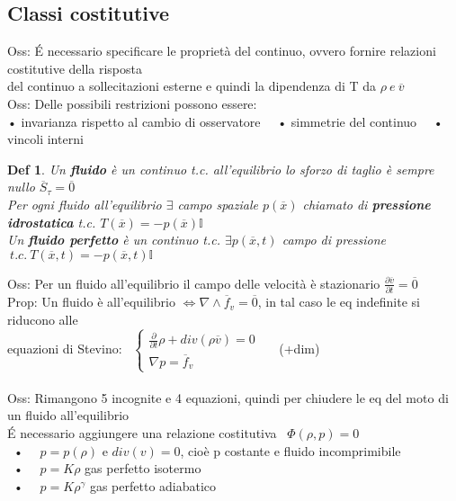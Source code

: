 \documentclass{article}
\theoremstyle{unnumbered}
\newtheorem* {theoremT}{Def}
\theoremstyle{unnumbered1}
\newenvironment{defi}{\begin{gBox}\begin{theoremT}}{\end{theoremT}\end{gBox}}
\begin{document}
\subsection{Classi costitutive}
%
Oss: É necessario specificare le proprietà del continuo, ovvero fornire relazioni costitutive della risposta\\
\phantom{Oss: }del continuo a sollecitazioni esterne e quindi la dipendenza di T da $\rho \ e \ \overline{v}$\\
Oss: Delle possibili restrizioni possono essere:\\ 
\phantom{Oss: }• invarianza rispetto al cambio di osservatore \ \ • simmetrie del continuo \ \ • vincoli interni
%
\begin{defi}
Un \textbf{fluido} è un continuo t.c. all'equilibrio lo sforzo di taglio è sempre nullo $\overline{S}_{\tau}=\overline{0}$\\
Per ogni fluido all'equilibrio $\exists$ campo spaziale $p(\overline{x})$ chiamato di \textbf{pressione idrostatica} t.c. $T(\overline{x})=-p(\overline{x})\mathbb{I}$\\
%
Un \textbf{fluido perfetto} è un continuo t.c. $\exists p(\overline{x},t) $ campo di pressione $ \ t.c. \ T(\overline{x},t)=-p(\overline{x},t)\mathbb{I}$
\end{defi}
%
Oss: Per un fluido all'equilibrio il campo delle velocità è stazionario $\frac{\partial \overline{v}}{\partial t}=\overline{0}$\\
%
%
%
Prop: Un fluido è all'equilibrio $\Longleftrightarrow\nabla \wedge \overline{f}_v=\overline{0}$, in tal caso le eq indefinite si riducono alle\\ \phantom{Prop: }equazioni di Stevino: \ 
$\begin{cases} \frac{\partial}{\partial t}\rho+div(\rho\overline{v})=0 \\ \nabla p=\overline{f}_v \end{cases}$\ \ \ (+dim)\\ \\
%
%
%
Oss: Rimangono 5 incognite e 4 equazioni, quindi per chiudere le eq del moto di un fluido all'equilibrio\\
\phantom{Oss: }É necessario aggiungere una relazione costitutiva \ $\Phi(\rho,p)=0$\\
\ • \ \ $p=p(\rho) \text{ e } div(v)=0$, cioè p costante e fluido incomprimibile\\
\ • \ \ $p=K\rho$ gas perfetto isotermo\\
\ • \ \ $p=K\rho^{\gamma}$ gas perfetto adiabatico\\ \\
\end{document}
